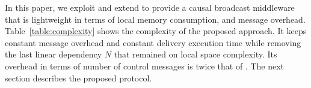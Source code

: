 





In this paper, we exploit and extend \PCBROADCAST to provide a causal broadcast
middleware that is lightweight in terms of local memory consumption, and message
overhead. Table~\ref{table:complexity} shows the complexity of the proposed
approach. It keeps constant message overhead and constant delivery execution
time while removing the last linear dependency $N$ that remained on local space
complexity. Its overhead in terms of number of control messages is twice that of
\PCBROADCAST.
The next section describes the proposed protocol.


